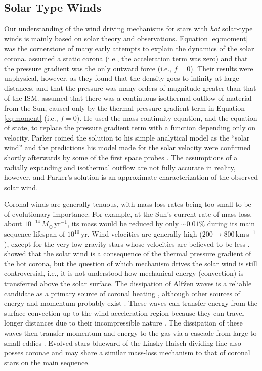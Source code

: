 \subsection{Solar Type Winds}\label{sec:1.4.2}
Our understanding of the wind driving mechanisms for stars with \textit{hot} solar-type winds is mainly based on solar theory and observations. Equation \ref{eq:moment} was the cornerstone of many early attempts to explain the dynamics of the solar corona. \cite{chapman_1957} assumed a static corona (i.e., the acceleration term was zero) and that the pressure gradient was the only outward force (i.e., $f=0$). Their results were unphysical, however, as they found that the density goes to infinity at large distances, and that the pressure was many orders of magnitude greater than that of the ISM. \cite{parker_1958} assumed that there was a continuous isothermal outflow of material from the Sun, caused only by the thermal pressure gradient term in Equation \ref{eq:moment} (i.e., $f=0$). He used the mass continuity equation, and the equation of state, to replace the pressure gradient term with a function depending only on velocity. Parker coined the solution to his simple analytical model as the ``solar wind'' and the predictions his model made for the solar velocity were confirmed shortly afterwards by some of the first space probes \citep[e.g.,][]{neugebauer_1962}. The assumptions of a radially expanding and isothermal outflow are not fully accurate in reality, however, and Parker's solution is an approximate characterization of the observed solar wind.

Coronal winds are generally tenuous, with mass-loss rates being too small to be of evolutionary importance. For example, at the Sun's current rate of mass-loss, about $10^{-14}\,M_{\odot}$\,yr$^{-1}$, its mass would be reduced by only $\sim 0.01 \%$ during its main sequence lifespan of $10^{10}$\,yr. Wind velocities are generally high ($200 \rightarrow 800$\,km\,s$^{-1}$), except for the very low gravity stars whose velocities are believed to be less \cite{drake_1986}. \cite{parker_1958} showed that the solar wind is a consequence of the thermal pressure gradient of the hot corona, but the question of which mechanism drives the solar wind is still controversial, i.e., it is not understood how mechanical energy (convection) is transferred above the solar surface. The dissipation of Alf\'ven waves is a reliable candidate as a primary source of coronal heating \citep{cranmer_2011}, although other sources of energy and momentum probably exist \cite[e.g.,][]{parker_1983,parker_1988}. These waves can transfer energy from the surface convection up to the wind acceleration region because they can travel longer distances due to their incompressible nature \citep[e.g.,][]{hollweg_1973}. The dissipation of these waves then transfer momentum and energy to the gas via a cascade from large to small eddies \citep{verdini_2007}. Evolved stars blueward of the Linsky-Haisch dividing line also posses coronae and may share a similar mass-loss mechanism to that of coronal stars on the main sequence. 

